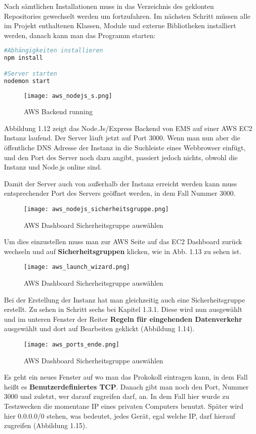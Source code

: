 Nach sämtlichen Installationen muss in das Verzeichnis des geklonten Repositories gewechselt werden um fortzufahren.
Im nächsten Schritt müssen alle im Projekt enthaltenen Klassen, Module und externe Bibliotheken installiert werden, danach kann man das Programm starten:
\begin{lstlisting}[language=bash]
#Abhängigkeiten installieren
npm install

#Server starten
nodemon start
\end{lstlisting}
\begin{center}
\begin{figure}[H]
    \centering
    \texttt{[image: aws\_nodejs\_s.png]}
    \caption{AWS Backend running}
\end{figure}
\end{center}
Abbildung 1.12 zeigt das Node.Js/Express Backend von EMS auf einer AWS EC2 Instanz laufend. 
Der Server läuft jetzt auf Port 3000. 
Wenn man nun aber die öffentliche DNS Adresse der Instanz in die Suchleiste eines Webbrowser einfügt, und den Port des Server noch dazu angibt, passiert jedoch nichts,
obwohl die Instanz und Node.js online sind.

Damit der Server auch von außerhalb der Instanz erreicht werden kann muss entsprechender Port des Servers geöffnet werden, in dem Fall Nummer 3000.
\begin{center}
\begin{figure}[h]
    \centering
    \texttt{[image: aws\_nodejs\_sicherheitsgruppe.png]}
    \caption{AWS Dashboard Sicherheitsgruppe auswählen}
\end{figure}
\end{center}
Um dies einzustellen muss man zur AWS Seite auf das EC2 Dashboard zurück wechseln und auf \textbf{Sicherheitsgruppen} klicken, wie in Abb. 1.13 zu sehen ist. 
\begin{center}
\begin{figure}[H]
    \centering
    \texttt{[image: aws\_launch\_wizard.png]}
    \caption{AWS Dashboard Sicherheitsgruppe auswählen}
\end{figure}
\end{center}
Bei der Erstellung der Instanz hat man gleichzeitig auch eine Sicherheitsgruppe erstellt. Zu sehen in Schritt sechs bei Kapitel 1.3.1.
Diese wird nun ausgewählt und im unteren Fenster der Reiter \textbf{Regeln für eingehenden Datenverkehr} ausgewählt und dort auf Bearbeiten geklickt (Abbildung 1.14).
\begin{center}
\begin{figure}[h]
    \centering
    \texttt{[image: aws\_ports\_ende.png]}
    \caption{AWS Dashboard Sicherheitsgruppe auswählen}
\end{figure}
\end{center}
Es geht ein neues Fenster auf wo man das Prokokoll eintragen kann, in dem Fall heißt es \textbf{Benutzerdefiniertes TCP}. Danach gibt man noch den Port, Nummer 3000 und zuletzt, wer darauf zugreifen darf, an. In dem Fall hier
wurde zu Testzwecken die momentane IP eines privaten Computers benutzt. Später wird hier 0.0.0.0/0 stehen, was bedeutet, jedes Gerät, egal welche IP, darf hierauf zugreifen (Abbildung 1.15). 

